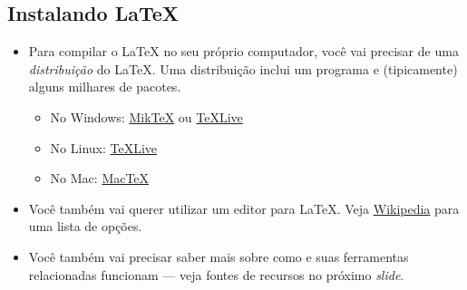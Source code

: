 \documentclass{beamer}
\begin{document}
\subsection{Instalando \LaTeX{}}
\begin{frame}{\insertsubsection}
\begin{itemize}
  \item Para compilar o \LaTeX{} no seu próprio computador, você vai precisar de uma \emph{distribuição} do \LaTeX{}.
  Uma distribuição inclui um programa  e (tipicamente) alguns milhares de pacotes.
  \begin{itemize}
    \item No Windows: \href{http://miktex.org/}{Mik\TeX} ou \href{http://tug.org/texlive/}{\TeX Live}
    \item No Linux: \href{http://tug.org/texlive/}{\TeX Live}
    \item No Mac: \href{http://tug.org/mactex/}{Mac\TeX}
  \end{itemize}
  \item Você também vai querer utilizar um editor para \LaTeX{}. Veja \href{http://en.wikipedia.org/wiki/Comparison_of_TeX_editors}{Wikipedia} para uma lista de opções.
  \item Você também vai precisar saber mais sobre como  e suas ferramentas relacionadas funcionam --- veja fontes de recursos no próximo \emph{slide}.
\end{itemize}
\end{frame}

\end{document}
